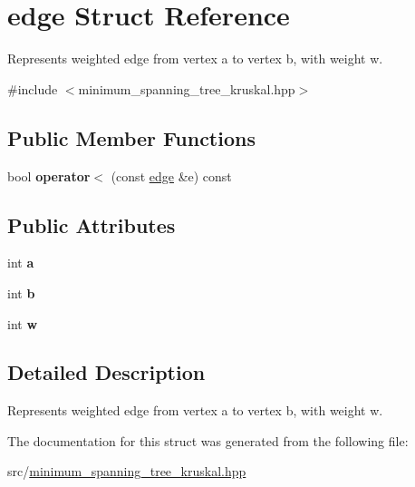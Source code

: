 \hypertarget{structedge}{}\section{edge Struct Reference}
\label{structedge}


Represents weighted edge from vertex a to vertex b, with weight w.  




{\ttfamily \#include $<$minimum\+\_\+spanning\+\_\+tree\+\_\+kruskal.\+hpp$>$}

\subsection*{Public Member Functions}
\begin{DoxyCompactItemize}
\item 
bool {\bfseries operator$<$} (const \hyperlink{structedge}{edge} \&e) const \hypertarget{structedge_a1be1d1dcbe96713a4dabdc83b9253b6d}{}\label{structedge_a1be1d1dcbe96713a4dabdc83b9253b6d}

\end{DoxyCompactItemize}
\subsection*{Public Attributes}
\begin{DoxyCompactItemize}
\item 
int {\bfseries a}\hypertarget{structedge_a4094684ed54ca0e4ec3a9b251bfb2b0f}{}\label{structedge_a4094684ed54ca0e4ec3a9b251bfb2b0f}

\item 
int {\bfseries b}\hypertarget{structedge_ae76a37f47c8fca97b8adfcb588130e0d}{}\label{structedge_ae76a37f47c8fca97b8adfcb588130e0d}

\item 
int {\bfseries w}\hypertarget{structedge_a2b4c1e3301482cde167eeb25135fa4ea}{}\label{structedge_a2b4c1e3301482cde167eeb25135fa4ea}

\end{DoxyCompactItemize}


\subsection{Detailed Description}
Represents weighted edge from vertex a to vertex b, with weight w. 

The documentation for this struct was generated from the following file\+:\begin{DoxyCompactItemize}
\item 
src/\hyperlink{minimum__spanning__tree__kruskal_8hpp}{minimum\+\_\+spanning\+\_\+tree\+\_\+kruskal.\+hpp}\end{DoxyCompactItemize}
